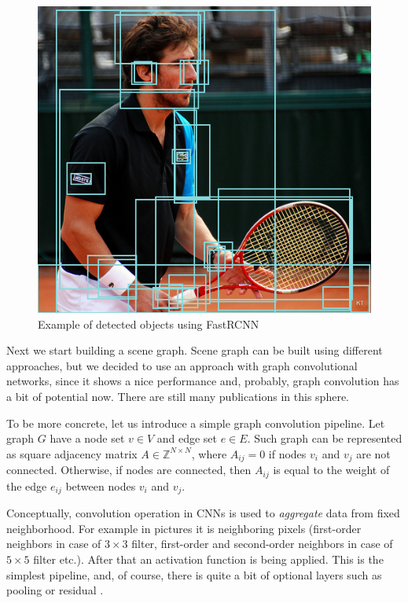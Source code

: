 \begin{figure}[!h]
    \centering
    \includegraphics[width=\textwidth]{figure/object-detected.png}
    \caption{Example of detected objects using FastRCNN}
    \label{objects-detected}
\end{figure}

Next we start building a scene graph. Scene graph can be built using different approaches, but we decided to use an approach with graph convolutional networks, since it shows a nice performance and, probably, graph convolution has a bit of potential now. There are still many publications in this sphere.

To be more concrete, let us introduce a simple graph convolution pipeline. Let graph $G$ have a node set $v\in V$ and edge set $e\in E$. Such graph can be represented as square adjacency matrix $A\in \mathbb{Z}^{N\times N}$, where $A_{ij}=0$ if nodes $v_i$ and $v_j$ are not connected. Otherwise, if nodes are connected, then $A_{ij}$ is equal to the weight of the edge $e_{ij}$ between nodes $v_i$ and $v_j$.

Conceptually, convolution operation in CNNs is used to \textit{aggregate} data from fixed neighborhood. For example in pictures it is neighboring pixels (first-order neighbors in case of $3\times 3$ filter, first-order and second-order neighbors in case of $5\times 5$ filter etc.). After that an activation function is being applied. This is the simplest pipeline, and, of course, there is quite a bit of optional layers such as pooling or residual \cite{He_Zhang_Ren_Sun_2015}.

